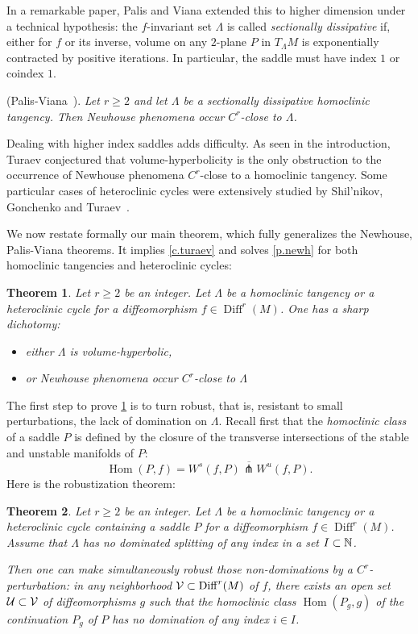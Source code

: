 \documentclass[11pt, a4paper]{amsart}
\theoremstyle{plain}
\newtheorem{theorem}{Theorem} %
\theoremstyle{definition}
\theoremstyle{remark}
\numberwithin{equation}{section}         %
\DeclareMathOperator{\Diff}{{Diff}}
\def\Diff{\operatorname{Diff}}
\def\Hom{\operatorname{Hom}}
\begin{document}
In a remarkable paper, Palis and Viana extended this to higher dimension under a technical hypothesis: the $f$-invariant set $\Lambda$ is called {\em sectionally dissipative} if, either for $f$ or its inverse, volume on any $2$-plane $P$ in $T_\Lambda M$ is exponentially contracted by positive iterations. In particular, the saddle must have index $1$ or coindex $1$. 
 \medskip

 
  (Palis-Viana~\cite{PV}). {\em Let $r\geq 2$ and let $\Lambda$ be a sectionally dissipative homoclinic tangency. Then Newhouse phenomena occur $C^r$-close to $\Lambda$. }
\medskip
 
Dealing with higher index saddles adds difficulty. As seen in the introduction, Turaev conjectured that volume-hyperbolicity is the only obstruction to the occurrence of Newhouse phenomena $C^r$-close to a homoclinic tangency.
Some particular cases of heteroclinic cycles were extensively studied by Shil'nikov, Gonchenko and Turaev~\cite{GST1,GST3}. 

We now restate formally our main theorem, which fully generalizes the Newhouse, Palis-Viana theorems. It implies  \cref{c.turaev} and solves \cref{p.newh} for both homoclinic tangencies and heteroclinic cycles:
  
\begin{theorem}\label{t.lambda}
Let $r\geq 2$ be an integer. Let $\Lambda$ be a homoclinic tangency or a heteroclinic cycle for a diffeomorphism $f\in \Diff^r(M)$. One has a sharp dichotomy:
\begin{itemize}
\item either $\Lambda$ is volume-hyperbolic,
\item or  Newhouse phenomena occur $C^r$-close to $\Lambda$
\end{itemize}
\end{theorem}


The first step to prove \cref{t.lambda} is to turn robust, that is, resistant to small perturbations, the lack of domination on $\Lambda$. 
Recall first that the {\em homoclinic class} of a saddle $P$ is defined by the closure of the transverse intersections of the stable and unstable manifolds of $P$:
$$\Hom(P,f)=\overline{W^s(f,P)\pitchfork W^u(f,P)}.$$
Here is the robustization theorem:

\begin{theorem}\label{t.robustization}
Let $r\geq 2$ be an integer.  Let $\Lambda$ be a homoclinic tangency or a heteroclinic cycle containing a saddle $P$  for a diffeomorphism $f\in \Diff^r(M)$. Assume that $\Lambda$ has no dominated splitting of any index in a set $I\subset {\mathbb N}$. 


Then one can make simultaneously robust  those non-dominations by a $C^r$-perturbation: in any neighborhood $\cV\subset \Diff^r(M)$ of $f$, there exists an open set ${\mathcal U}\subset {\mathcal V}$ of diffeomorphisms $g$ such that the homoclinic class $\Hom(P_g,g)$ of the continuation $P_g$ of $P$ has no domination of any index $i\in I$.
\end{theorem}
\end{document}
